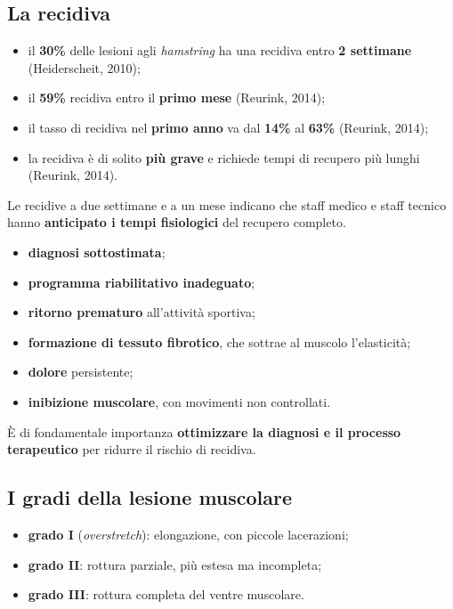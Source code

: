 \subsection{La recidiva}

\begin{itemize}
  \item il \textbf{30\%} delle lesioni agli \textit{hamstring} ha una recidiva entro
    \textbf{2 settimane} (Heiderscheit, 2010);
  \item il \textbf{59\%} recidiva entro il \textbf{primo mese} (Reurink, 2014);
  \item il tasso di recidiva nel \textbf{primo anno} va dal \textbf{14\%} al \textbf{63\%}
    (Reurink, 2014);
  \item la recidiva è di solito \textbf{più grave} e richiede tempi di recupero più lunghi
    (Reurink, 2014).
\end{itemize}

Le recidive a due settimane e a un mese indicano che staff medico e staff tecnico hanno
\textbf{anticipato i tempi fisiologici} del recupero completo.

\begin{itemize}
  \item \textbf{diagnosi sottostimata};
  \item \textbf{programma riabilitativo inadeguato};
  \item \textbf{ritorno prematuro} all'attività sportiva;
  \item \textbf{formazione di tessuto fibrotico}, che sottrae al muscolo l'elasticità;
  \item \textbf{dolore} persistente;
  \item \textbf{inibizione muscolare}, con movimenti non controllati.
\end{itemize}

È di fondamentale importanza \textbf{ottimizzare la diagnosi e il processo terapeutico} per ridurre
il rischio di recidiva.

\subsection{I gradi della lesione muscolare}

\begin{itemize}
  \item \textbf{grado I} (\textit{overstretch}): elongazione, con piccole lacerazioni;
  \item \textbf{grado II}: rottura parziale, più estesa ma incompleta;
  \item \textbf{grado III}: rottura completa del ventre muscolare.
\end{itemize}

